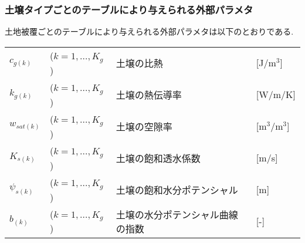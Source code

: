 \subsubsection{土壌タイプごとのテーブルにより与えられる外部パラメタ}

土地被覆ごとのテーブルにより与えられる外部パラメタは以下のとおりである.

\begin{tabular}{llll}
$c_{g(k)}$ & ($k=1,\ldots,K_g$) & 土壌の比熱 & [J/m$^3$] \\
$k_{g(k)}$ & ($k=1,\ldots,K_g$) & 土壌の熱伝導率 & [W/m/K] \\
$w_{sat(k)}$ & ($k=1,\ldots,K_g$) & 土壌の空隙率 & [m$^3$/m$^3$] \\
$K_{s(k)}$ & ($k=1,\ldots,K_g$) & 土壌の飽和透水係数 & [m/s] \\
$\psi_{s(k)}$ & ($k=1,\ldots,K_g$) & 土壌の飽和水分ポテンシャル & [m] \\
$b_{(k)}$ & ($k=1,\ldots,K_g$) & 土壌の水分ポテンシャル曲線の指数 & [-]
\end{tabular}
